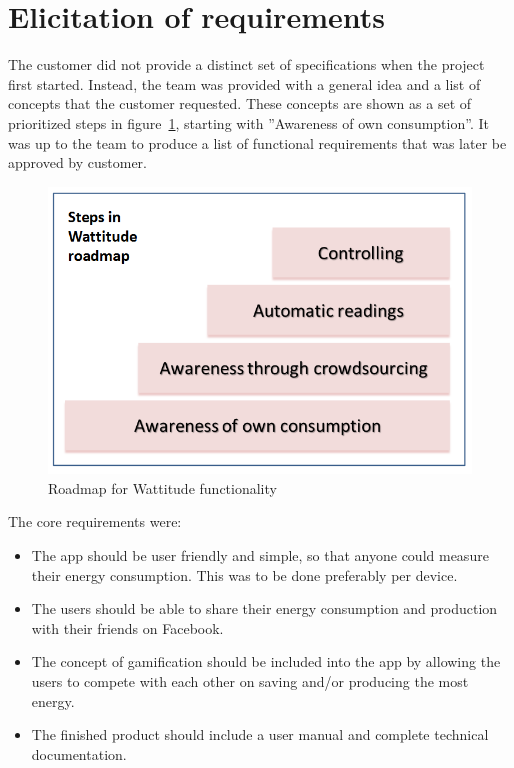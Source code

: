 \section{Elicitation of requirements}
\label{sec:obtainingreq}

The customer did not provide a distinct set of specifications when the project first started. Instead, the team was provided with a general idea and a list of concepts that the customer requested. These concepts are shown as a set of prioritized steps in figure~\ref{fig:roadmap}, starting with ''Awareness of own consumption''. It was up to the team to produce a list of functional requirements that was later be approved by customer.

\begin{figure}[H]
\centering
\includegraphics[height=0.37\textheight]{ch/specification/fig/roadmap.png}
\caption{Roadmap for Wattitude functionality}
\label{fig:roadmap}
\end{figure}

The core requirements were:
\begin{itemize}
\item The app should be user friendly and simple, so that anyone could measure their energy consumption. This was to be done preferably per device. 
\item The users should be able to share their energy consumption and production with their friends on Facebook. 
\item The concept of \gls{gamification} should be included into the app by allowing the users to compete with each other on saving and/or producing the most energy. 
\item The finished product should include a user manual and complete technical documentation.
\end{itemize}

